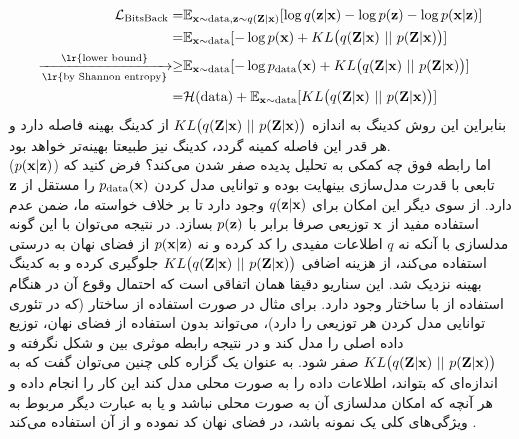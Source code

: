 \begin{align}
	\mathcal{L}_{\text{BitsBack}} =
	                                                                           & \expected_{\bff{x} \sim \text{data}, \bff{z} \sim q(\bff{Z}|\bff{x})} [\log q(\bff{z}|\bff{x}) -\log p(\bff{z}) - \log p(\bff{x}|\bff{z})] \nonumber
	\\
	=
	                                                                           & \expected_{\bff{x} \sim \text{data}} [-\log p(\bff{x}) + KL\big(q(\bff{Z}|\bff{x}) ~||~ p(\bff{Z}|\bff{x})\big)] \nonumber
	\\
	\xrightarrow[\text{\lr{by Shannon entropy}}]{\text{\lr{lower bound}}} \geq & \expected_{\bff{x} \sim \text{data}} [-\log p_{\text{data}}(\bff{x}) + KL\big(q(\bff{Z}|\bff{x}) ~||~ p(\bff{Z}|\bff{x})\big)] \nonumber
	\\
	=
	                                                                           & \mathcal{H}(\text{data}) + \expected_{\bff{x} \sim \text{data}} [KL\big(q(\bff{Z}|\bff{x}) ~||~ p(\bff{Z}|\bff{x})\big)]
\end{align}
بنابراین این روش کدینگ به اندازه
$KL\big(q({\bf Z}|{\bf x}) ~||~ p({\bf Z}|{\bf x})\big)$
از کدینگ بهینه فاصله دارد و هر قدر این فاصله کمینه گردد، کدینگ نیز طبیعتا بهینه‌تر خواهد بود. \\
اما رابطه فوق چه کمکی به تحلیل پدیده صفر شدن  می‌کند؟ فرض کنید که \decoder{}
($p({\bf x}|{\bf z})$)
تابعی با قدرت مدل‌سازی بینهایت بوده و توانایی مدل کردن $p_{\text{data}}({\bf x})$ را مستقل از ${\bf z}$ دارد. از سوی دیگر این امکان برای $q({\bf z}|{\bf x})$ وجود دارد تا بر خلاف خواسته ما، ضمن عدم استفاده مفید از ${\bf x}$ توزیعی صرفا برابر با $p({\bf z})$ بسازد. در نتیجه می‌توان با این گونه مدلسازی با آنکه نه $q$ اطلاعات مفیدی را کد کرده و نه $p({\bf x}|{\bf z})$ از فضای نهان به درستی استفاده می‌کند، از هزینه اضافی
$KL\big(q({\bf Z}|{\bf x}) ~||~ p({\bf Z}|{\bf x})\big)$
جلوگیری کرده و به کدینگ بهینه نزدیک شد. این سناریو دقیقا همان اتفاقی است که احتمال وقوع آن در هنگام استفاده از \decoder{} با ساختار \autoregressive{} وجود دارد. برای مثال در صورت استفاده از ساختار \lstm{} (که در تئوری توانایی مدل کردن هر توزیعی را دارد)، \decoder{} می‌تواند بدون استفاده از فضای نهان، توزیع داده اصلی را مدل کند و در نتیجه رابطه موثری بین \decoder{} و \encoder{} شکل نگرفته و 
$KL\big(q({\bf Z}|{\bf x}) ~||~ p({\bf Z}|{\bf x})\big)$
صفر شود. به عنوان یک گزاره کلی چنین می‌توان گفت که \decoder{} به اندازه‌ای که بتواند، اطلاعات داده را به صورت محلی مدل کند این کار را انجام داده و هر آنچه که امکان مدلسازی آن به صورت محلی نباشد و یا به عبارت دیگر مربوط به ویژگی‌های کلی یک نمونه باشد، در فضای نهان کد نموده و از آن استفاده می‌کند \cite{vae_lossy}.
